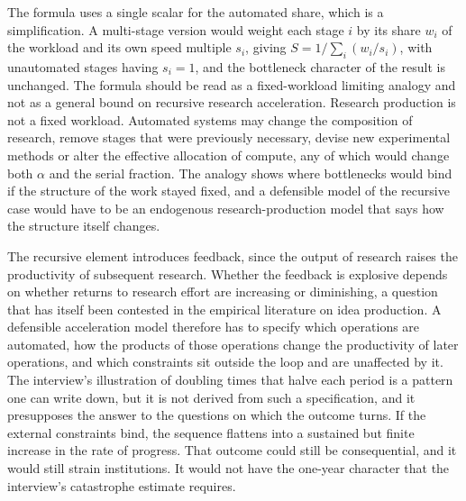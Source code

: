 \documentclass[11pt]{article}
\begin{document}
The formula uses a single scalar for the automated share, which is a simplification. A multi-stage version would weight each stage $i$ by its share $w_i$ of the workload and its own speed multiple $s_i$, giving $S=1/\sum_i (w_i/s_i)$, with unautomated stages having $s_i=1$, and the bottleneck character of the result is unchanged. The formula should be read as a fixed-workload limiting analogy and not as a general bound on recursive research acceleration. Research production is not a fixed workload. Automated systems may change the composition of research, remove stages that were previously necessary, devise new experimental methods or alter the effective allocation of compute, any of which would change both $\alpha$ and the serial fraction. The analogy shows where bottlenecks would bind if the structure of the work stayed fixed, and a defensible model of the recursive case would have to be an endogenous research-production model that says how the structure itself changes.

The recursive element introduces feedback, since the output of research raises the productivity of subsequent research. Whether the feedback is explosive depends on whether returns to research effort are increasing or diminishing, a question that has itself been contested in the empirical literature on idea production. A defensible acceleration model therefore has to specify which operations are automated, how the products of those operations change the productivity of later operations, and which constraints sit outside the loop and are unaffected by it. The interview's illustration of doubling times that halve each period is a pattern one can write down, but it is not derived from such a specification, and it presupposes the answer to the questions on which the outcome turns. If the external constraints bind, the sequence flattens into a sustained but finite increase in the rate of progress. That outcome could still be consequential, and it would still strain institutions. It would not have the one-year character that the interview's catastrophe estimate requires.
\end{document}
